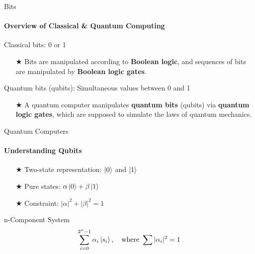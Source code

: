 \documentclass{beamer}
\begin{document}


\begin{frame}{Bits}
	\framesubtitle{Overview of Classical \& Quantum Computing}
    Classical bits: 0 or 1
    \begin{itemize}
        \item[$\bigstar$] Bits are manipulated according to \textbf{Boolean logic}, and sequences of bits are manipulated by \textbf{Boolean logic gates}.
    \end{itemize}
    Quantum bits (qubits): Simultaneous values between 0 and 1
    \begin{itemize}
        \item[$\bigstar$]  A quantum computer manipulates \textbf{quantum bits} (qubits) via \textbf{quantum logic gates}, which are supposed to simulate the laws of quantum mechanics.
    \end{itemize}
\end{frame}




\begin{frame}{Quantum Computers}
	\framesubtitle{Understanding Qubits}
    \begin{itemize}
        \item[$\bigstar$] Two-state representation: \(\ket{0}\) and \(\ket{1}\)
        \item[$\bigstar$] Pure states: \(\alpha \ket{0} + \beta \ket{1}\)
        \item[$\bigstar$] Constraint: \(|\alpha|^2 + |\beta|^2 = 1\)
    \end{itemize}
    \pause
    \begin{block}{n-Component System}
        \[ \sum_{i = 0}^{2^n - 1} \alpha_i \ket{s_i}, \quad \text{where } \sum |\alpha_i|^2 = 1 \]
    \end{block}
\end{frame}



\end{document}
